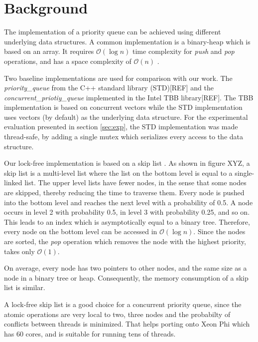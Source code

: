 \section{Background}
\label{sec:background}

The implementation of a priority queue can be achieved using different underlying data structures.
A common implementation is a binary-heap which is based on an array. It requires $\mathcal{O}(\log{}n)$ time complexity for \textit{push} and \textit{pop} operations, and has a space complexity of $\mathcal{O}(n)$ .

Two baseline implementations are used for comparison with our work.
The \textit{priority\_queue} from the C++ standard library (STD)[REF] and the \textit{concurrent\_priotiy\_queue} implemented in the Intel TBB library[REF].
The TBB implementation is based on concurrent vectors while the STD implementation uses vectors (by default) as the underlying data structure.
For the experimental evaluation presented in section \ref{sec:exp}, the STD implementation was made thread-safe, by adding a single mutex which serializes every access to the data structure.

Our lock-free implementation is based on a skip list \cite{Pugh:1990:SLP:78973.78977}.
As shown in figure XYZ, a skip list is a multi-level list where the list on the bottom level is equal to a single-linked list.
The upper level lists have fewer nodes, in the sense that some nodes are skipped, thereby reducing the time to traverse them.
Every node is pushed into the bottom level and reaches the next level with a probability of 0.5.
A node occurs in level 2 with probability 0.5, in level 3 with probability 0.25, and so on.
This leads to an index which is asymptotically equal to a binary tree.
Therefore, every node on the bottom level can be accessed in $\mathcal{O}(\log{}n)$.
Since the nodes are sorted, the \textit{pop} operation which removes the node with the highest priority, takes only $\mathcal{O}(1)$.

On average, every node has two pointers to other nodes, and the same size as a node in a binary tree or heap.
Consequently, the memory consumption of a skip list is similar.

A lock-free skip list is a good choice for a concurrent priority queue, since the atomic operations are very local to two, three nodes and the probabilty of conflicts between threads is minimized.
That helps porting onto Xeon Phi which has 60 cores, and is suitable for running tens of threads.
